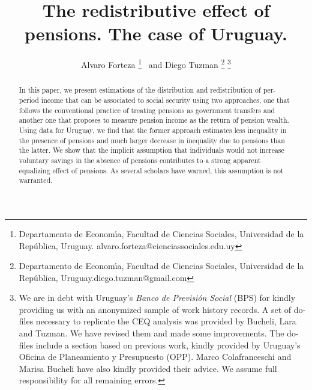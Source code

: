 \documentclass{article}
\begin{document}
\title{The redistributive effect of pensions. The case of Uruguay.}

\author{Alvaro Forteza 
\thanks{Departamento de Econom\'{\i}a, Facultad de Ciencias Sociales, Universidad de la República, Uruguay. alvaro.forteza@cienciassociales.edu.uy} \
and Diego Tuzman
\thanks{Departamento de Econom\'{\i}a, Facultad de Ciencias Sociales, Universidad de la República, Uruguay.diego.tuzman@gmail.com}
\thanks{We are in debt with Uruguay's \emph{Banco de Previsión Social} (BPS) for kindly providing us with an anonymized sample of work history records. A set of do-files necessary to replicate the CEQ analysis was provided by Bucheli, Lara and Tuzman. We have revised them and made some improvements. The do-files include a section based on previous work, kindly provided by Uruguay's Oficina de Planeamiento y Presupuesto (OPP). Marco Colafranceschi and Marisa Bucheli have also kindly provided their advice. We assume full responsibility for all remaining errors. } 
}
 
 
\maketitle

\begin{abstract}
    In this paper, we present estimations of the distribution and redistribution of per-period income that can be associated to social security using two approaches, one that follows the conventional practice of treating pensions as government transfers and another one that proposes to measure pension income as the return of pension wealth. Using data for Uruguay, we find that the former approach estimates less inequality in the presence of pensions and much larger decrease in inequality due to pensions than the latter. We show that the implicit assumption that individuals would not increase voluntary savings in the absence of pensions contributes to a strong apparent equalizing effect of pensions. As several scholars have warned, this assumption is not warranted.     
\end{abstract}



















\end{document}
